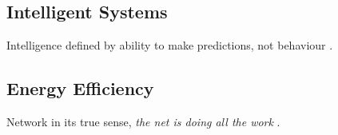 \documentclass[12pt, a4paper]{article}
\begin{document}
%


\subsection{Intelligent Systems}

Intelligence defined by ability to make predictions, not behaviour \cite{intelligence_is_prediction}.

%
%
%
%
%
%

\subsection{Energy Efficiency}

Network in its true sense, \textit{the net is doing all the work} \cite{net_doing_all_the_work}.

\cite{ahah}
\end{document}
